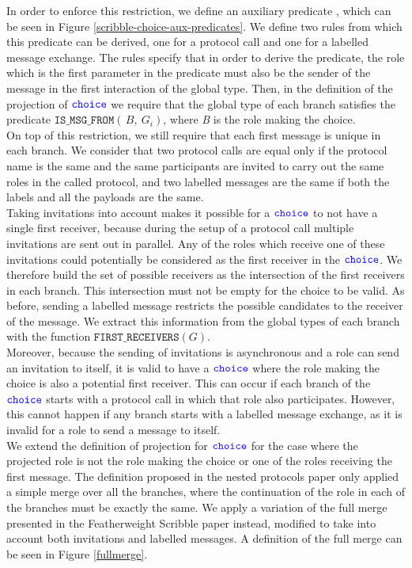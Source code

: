 \documentclass[12pt,twoside]{report}
\begin{document}
In order to enforce this restriction, we define an auxiliary predicate \texttt{}, which can be seen in Figure \ref{scribble-choice-aux-predicates}. We define two rules from which this predicate can be derived, one for a protocol call and one for a labelled message exchange. The rules specify that in order to derive the predicate, the role which is the first parameter in the predicate must also be the sender of the message in the first interaction of the global type. Then, in the definition of the projection of ${\color{blue}\mathtt{choice}}$ we require that the global type of each branch satisfies the predicate $\mathtt{IS\_MSG\_FROM}(\,B,\ G_i)$, where \textit{B} is the role making the choice.\\

On top of this restriction, we still require that each first message is unique in each branch. We consider that two protocol calls are equal only if the protocol name is the same and the same participants are invited to carry out the same roles in the called protocol, and two labelled messages are the same if both the labels and all the payloads are the same.\\

Taking invitations into account makes it possible for a ${\color{blue}\mathtt{choice}}$ to not have a single first receiver, because during the setup of a protocol call multiple invitations are sent out in parallel. Any of the roles which receive one of these invitations could potentially be considered as the first receiver in the ${\color{blue}\mathtt{choice}}$. We therefore build the set of possible receivers as the intersection of the first receivers in each branch. This intersection must not be empty for the choice to be valid. As before, sending a labelled message restricts the possible candidates to the receiver of the message. We extract this information from the global types of each branch with the function $\mathtt{FIRST\_RECEIVERS}(G)$.\\

Moreover, because the sending of invitations is asynchronous and a role can send an invitation to itself, it is valid to have a ${\color{blue}\mathtt{choice}}$ where the role making the choice is also a potential first receiver. This can occur if each branch of the ${\color{blue}\mathtt{choice}}$ starts with a protocol call in which that role also participates. However, this cannot happen if any branch starts with a labelled message exchange, as it is invalid for a role to send a message to itself.\\


We extend the definition of projection for ${\color{blue}\mathtt{choice}}$ for the case where the projected role is not the role making the choice  or one of the roles receiving the first message. The definition proposed in the nested protocols paper only applied a simple merge over all the branches, where the continuation of the role in each of the branches must be exactly the same. We apply a variation of the full merge presented in the Featherweight Scribble paper\cite{featherweight} instead, modified to take into account both invitations and labelled messages. A definition of the full merge can be seen in Figure \ref{fullmerge}.\\
\end{document}
